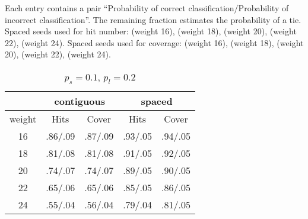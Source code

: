 \begin{table}[t]
\caption{Each entry contains a pair ``Probability of correct
  classification/Probability of incorrect classification''. The
  remaining fraction estimates the probability of a tie. Spaced seeds used for hit number: 
  \SHAPE{\footnotesize \#\#\#-\#\#-\#-\#---\#-\#-\#--\#--\#\#\#\#\#} (weight 16),
  \SHAPE{\footnotesize \#\#\#\#-\#\#--\#\#--\#--\#-\#-\#-\#\#-\#\#\#\#} (weight 18),
\SHAPE{\footnotesize \#\#\#\#\#-\#\#\#---\#\#--\#--\#-\#-\#-\#\#-\#\#\#\#} (weight 20), 
\SHAPE{\footnotesize \#\#\#\#\#\#--\#\#\#\#----\#--\#\#-\#-\#--\#\#\#\#\#\#\#} (weight 22),
\SHAPE{\footnotesize \#\#\#\#\#\#\#--\#\#\#\#----\#--\#\#-\#-\#--\#\#\#\#\#\#\#\#} (weight 24). 
Spaced seeds used for coverage: 
  \SHAPE{\footnotesize \#\#\#-\#\#\#--\#-\#--\#-\#\#--\#\#\#\#\#} (weight 16),
  \SHAPE{\footnotesize \#\#\#-\#--\#\#\#-\#\#--\#-\#--\#\#\#-\#\#\#\#} (weight 18),
\SHAPE{\footnotesize \#\#\#-\#-\#\#-\#-\#\#--\#\#--\#\#\#-\#-\#\#\#\#\#} (weight 20), 
\SHAPE{\footnotesize \#\#\#\#-\#\#-\#-\#-\#\#-\#\#\#-\#-\#--\#\#--\#\#\#\#\#} (weight 22),
\SHAPE{\footnotesize \#\#\#\#-\#\#-\#-\#-\#\#-\#\#\#-\#-\#---\#\#\#--\#\#\#\#\#\#} (weight 24).  
\label{table1}}
\centering

\begin{subtable}{0.4\textwidth}
\centering
\begin{tabular}{|c|c|c|c|c|}
\hline
&\multicolumn{2}{|c|}{contiguous}&
\multicolumn{2}{|c|}{spaced}\\
\hline
weight&Hits&Cover&Hits&Cover\\
\hline
16 & .86/.09 & .87/.09 & .93/.05 & .94/.05 \\
18 & .81/.08 & .81/.08 & .91/.05 & .92/.05 \\
20 & .74/.07 & .74/.07 & .89/.05 & .90/.05 \\
22 & .65/.06 & .65/.06 & .85/.05 & .86/.05 \\
24 & .55/.04 & .56/.04 & .79/.04 & .81/.05 \\
\hline
\end{tabular}
\caption{$p_s=0.1$, $p_l=0.2$\label{0102}}
\end{subtable}
\medskip


\end{table}
